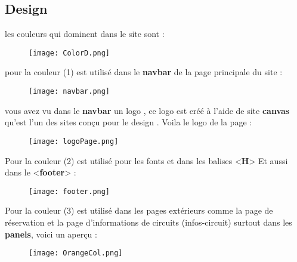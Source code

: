 \documentclass[a4paper,12pt]{report}
\begin{document}
\subsection{Design}
les couleurs qui dominent dans le site sont :
\begin{figure}[H]
\begin{center}
\centering
\texttt{[image: ColorD.png]}
\end{center}
\label{Color}
\end{figure}
pour la couleur (1) est utilisé dans le \textbf{navbar} de la page principale du site :
\begin{figure}[H]
\begin{center}
\centering
\texttt{[image: navbar.png]}
\end{center}
\label{navbar}
\end{figure}
vous avez vu dans le \textbf{navbar} un logo , ce logo est créé à l'aide de site \textbf{canvas} qu'est l'un des sites conçu pour le design .
Voila le logo de la page :
\begin{figure}[H]
\begin{center}
\centering
\texttt{[image: logoPage.png]}
\end{center}
\label{navbar}
\end{figure}
Pour la couleur (2) est utilisé pour les fonts et dans les balises <\textbf{H}>
Et aussi dans le <\textbf{footer}> :
\begin{figure}[H]
\begin{center}
\centering
\texttt{[image: footer.png]}
\end{center}
\label{footer}
\end{figure}
Pour la couleur (3) est utilisé dans les pages extérieurs comme la page de réservation et la page d'informations de circuits (infos-circuit) surtout dans les \textbf{panels}, voici un aperçu :
\begin{figure}[H]
\begin{center}
\centering
\texttt{[image: OrangeCol.png]}
\end{center}
\label{orange}
\end{figure}
\end{document}
